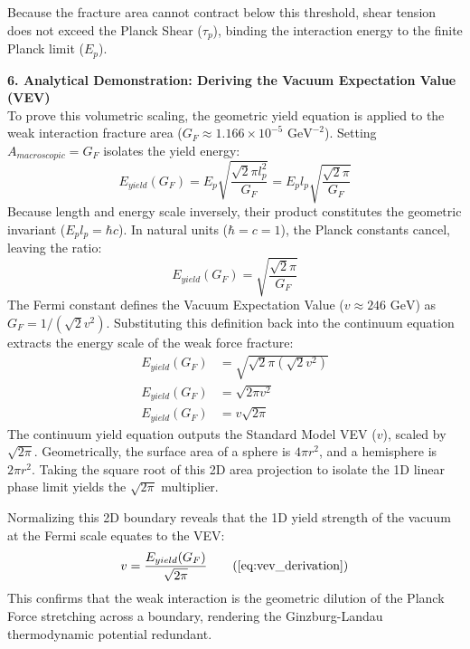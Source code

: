 Because the fracture area cannot contract below this threshold, shear tension does not exceed the Planck Shear ($\tau_p$), binding the interaction energy to the finite Planck limit ($E_p$).

\vspace{0.2 cm}

\textbf{6. Analytical Demonstration: Deriving the Vacuum Expectation Value (VEV)}\\
To prove this volumetric scaling, the geometric yield equation is applied to the weak interaction fracture area ($G_F \approx 1.166 \times 10^{-5} \text{ GeV}^{-2}$). Setting $A_{macroscopic} = G_F$ isolates the yield energy:
\begin{equation}
    E_{yield}(G_F) = E_p \sqrt{\frac{\sqrt{2}\pi l_p^2}{G_F}} = E_p l_p \sqrt{\frac{\sqrt{2}\pi}{G_F}} \nonumber
\end{equation}
Because length and energy scale inversely, their product constitutes the geometric invariant ($E_p l_p = \hbar c$). In natural units ($\hbar=c=1$), the Planck constants cancel, leaving the ratio:
\begin{equation}
    E_{yield}(G_F) = \sqrt{\frac{\sqrt{2}\pi}{G_F}} \nonumber
\end{equation}
The Fermi constant defines the Vacuum Expectation Value ($v \approx 246 \text{ GeV}$) as $G_F = 1/(\sqrt{2}v^2)$. Substituting this definition back into the continuum equation extracts the energy scale of the weak force fracture:
\begin{align}
    E_{yield}(G_F) &= \sqrt{\sqrt{2}\pi (\sqrt{2}v^2)} \nonumber \\
    E_{yield}(G_F) &= \sqrt{2\pi v^2} \nonumber \\
    E_{yield}(G_F) &= v\sqrt{2\pi} \nonumber
\end{align}
The continuum yield equation outputs the Standard Model VEV ($v$), scaled by $\sqrt{2\pi}$. Geometrically, the surface area of a sphere is $4\pi r^2$, and a hemisphere is $2\pi r^2$. Taking the square root of this 2D area projection to isolate the 1D linear phase limit yields the $\sqrt{2\pi}$ multiplier.

Normalizing this 2D boundary reveals that the 1D yield strength of the vacuum at the Fermi scale equates to the VEV:
\begin{equation}
    v = \frac{E_{yield}(G_F)}{\sqrt{2\pi}} \tag{\ref{eq:vev_derivation}}
\end{equation}
This confirms that the weak interaction is the geometric dilution of the Planck Force stretching across a boundary, rendering the Ginzburg-Landau thermodynamic potential redundant.

